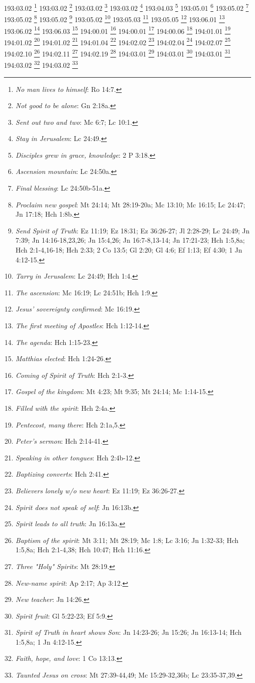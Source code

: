 {{{{{{{{{{{{{{{{{{{{{{{{{{{{{{{{{{{{{{{{{{{{{{{{{{{{{{{{{{{{{{{{{{{{{{{{{{{{{{{{{{{{{{{{{{{{{{{193:03.02 \footnote{\textit{No man lives to himself}: Ro 14:7.}
193:03.02 \footnote{\textit{Not good to be alone}: Gn 2:18a.}
193:03.02 \footnote{\textit{Sent out two and two}: Mc 6:7; Lc 10:1.}
193:03.02 \footnote{\textit{Stay in Jerusalem}: Lc 24:49.}
193:04.03 \footnote{\textit{Disciples grew in grace, knowledge}: 2 P 3:18.}
193:05.01 \footnote{\textit{Ascension mountain}: Lc 24:50a.}
193:05.02 \footnote{\textit{Final blessing}: Lc 24:50b-51a.}
193:05.02 \footnote{\textit{Proclaim new gospel}: Mt 24:14; Mt 28:19-20a; Mc 13:10; Mc 16:15; Lc 24:47; Jn 17:18; Hch 1:8b.}
193:05.02 \footnote{\textit{Send Spirit of Truth}: Ez 11:19; Ez 18:31; Ez 36:26-27; Jl 2:28-29; Lc 24:49; Jn 7:39; Jn 14:16-18,23,26; Jn 15:4,26; Jn 16:7-8,13-14; Jn 17:21-23; Hch 1:5,8a; Hch 2:1-4,16-18; Hch 2:33; 2 Co 13:5; Gl 2:20; Gl 4:6; Ef 1:13; Ef 4:30; 1 Jn 4:12-15.}
193:05.02 \footnote{\textit{Tarry in Jerusalem}: Lc 24:49; Hch 1:4.}
193:05.03 \footnote{\textit{The ascension}: Mc 16:19; Lc 24:51b; Hch 1:9.}
193:05.05 \footnote{\textit{Jesus' sovereignty confirmed}: Mc 16:19.}
193:06.01 \footnote{\textit{The first meeting of Apostles}: Hch 1:12-14.}
193:06.02 \footnote{\textit{The agenda}: Hch 1:15-23.}
193:06.03 \footnote{\textit{Matthias elected}: Hch 1:24-26.}
194:00.01 \footnote{\textit{Coming of Spirit of Truth}: Hch 2:1-3.}
194:00.01 \footnote{\textit{Gospel of the kingdom}: Mt 4:23; Mt 9:35; Mt 24:14; Mc 1:14-15.}
194:00.06 \footnote{\textit{Filled with the spirit}: Hch 2:4a.}
194:01.01 \footnote{\textit{Pentecost, many there}: Hch 2:1a,5.}
194:01.02 \footnote{\textit{Peter's sermon}: Hch 2:14-41.}
194:01.02 \footnote{\textit{Speaking in other tongues}: Hch 2:4b-12.}
194:01.04 \footnote{\textit{Baptizing converts}: Hch 2:41.}
194:02.02 \footnote{\textit{Believers lonely w/o new heart}: Ez 11:19; Ez 36:26-27.}
194:02.04 \footnote{\textit{Spirit does not speak of self}: Jn 16:13b.}
194:02.07 \footnote{\textit{Spirit leads to all truth}: Jn 16:13a.}
194:02.10 \footnote{\textit{Baptism of the spirit}: Mt 3:11; Mt 28:19; Mc 1:8; Lc 3:16; Jn 1:32-33; Hch 1:5,8a; Hch 2:1-4,38; Hch 10:47; Hch 11:16.}
194:02.11 \footnote{\textit{Three "Holy" Spirits}: Mt 28:19.}
194:02.19 \footnote{\textit{New-name spirit}: Ap 2:17; Ap 3:12.}
194:03.01 \footnote{\textit{New teacher}: Jn 14:26.}
194:03.01 \footnote{\textit{Spirit fruit}: Gl 5:22-23; Ef 5:9.}
194:03.01 \footnote{\textit{Spirit of Truth in heart shows Son}: Jn 14:23-26; Jn 15:26; Jn 16:13-14; Hch 1:5,8a; 1 Jn 4:12-15.}
194:03.02 \footnote{\textit{Faith, hope, and love}: 1 Co 13:13.}
194:03.02 \footnote{\textit{Taunted Jesus on cross}: Mt 27:39-44,49; Mc 15:29-32,36b; Lc 23:35-37,39.}
}}}}}}}}}}}}}}}}}}}}}}}}}}}}}}}}}}}}}}}}}}}}}}}}}}}}}}}}}}}}}}}}}}}}}}}}}}}}}}}}}}}}}}}}}}}}}}}
